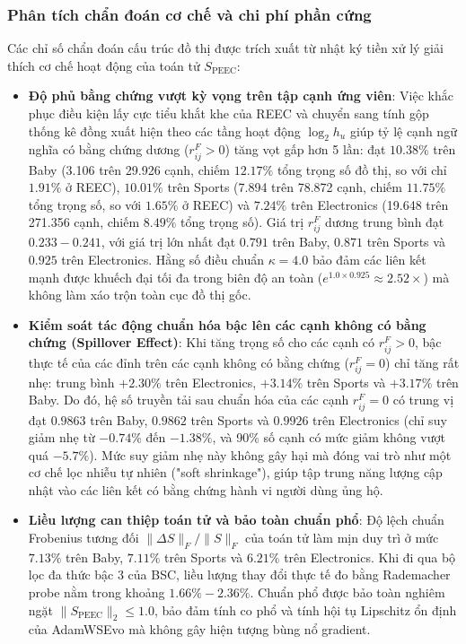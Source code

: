 \subsubsection{Phân tích chẩn đoán cơ chế và chi phí phần cứng}

Các chỉ số chẩn đoán cấu trúc đồ thị được trích xuất từ nhật ký tiền xử lý giải thích cơ chế hoạt động của toán tử $S_{\text{PEEC}}$:
\begin{itemize}
    \item \textbf{Độ phủ bằng chứng vượt kỳ vọng trên tập cạnh ứng viên}: Việc khắc phục điều kiện lấy cực tiểu khắt khe của REEC và chuyển sang tính gộp thống kê đồng xuất hiện theo các tầng hoạt động $\log_2 h_u$ giúp tỷ lệ cạnh ngữ nghĩa có bằng chứng dương ($r_{ij}^F > 0$) tăng vọt gấp hơn 5 lần: đạt $10.38\%$ trên Baby (3.106 trên 29.926 cạnh, chiếm $12.17\%$ tổng trọng số đồ thị, so với chỉ $1.91\%$ ở REEC), $10.01\%$ trên Sports (7.894 trên 78.872 cạnh, chiếm $11.75\%$ tổng trọng số, so với $1.65\%$ ở REEC) và $7.24\%$ trên Electronics (19.648 trên 271.356 cạnh, chiếm $8.49\%$ tổng trọng số). Giá trị $r_{ij}^F$ dương trung bình đạt $0.233 - 0.241$, với giá trị lớn nhất đạt $0.791$ trên Baby, $0.871$ trên Sports và $0.925$ trên Electronics. Hằng số điều chuẩn $\kappa = 4.0$ bảo đảm các liên kết mạnh được khuếch đại tối đa trong biên độ an toàn ($e^{1.0 \times 0.925} \approx 2.52\times$) mà không làm xáo trộn toàn cục đồ thị gốc.
    \item \textbf{Kiểm soát tác động chuẩn hóa bậc lên các cạnh không có bằng chứng (Spillover Effect)}: Khi tăng trọng số cho các cạnh có $r_{ij}^F > 0$, bậc thực tế của các đỉnh trên các cạnh không có bằng chứng ($r_{ij}^F = 0$) chỉ tăng rất nhẹ: trung bình $+2.30\%$ trên Electronics, $+3.14\%$ trên Sports và $+3.17\%$ trên Baby. Do đó, hệ số truyền tải sau chuẩn hóa của các cạnh $r_{ij}^F = 0$ có trung vị đạt $0.9863$ trên Baby, $0.9862$ trên Sports và $0.9926$ trên Electronics (chỉ suy giảm nhẹ từ $-0.74\%$ đến $-1.38\%$, và 90\% số cạnh có mức giảm không vượt quá $-5.7\%$). Mức suy giảm nhẹ này không gây hại mà đóng vai trò như một cơ chế lọc nhiễu tự nhiên ("soft shrinkage"), giúp tập trung năng lượng cập nhật vào các liên kết có bằng chứng hành vi người dùng ủng hộ.
    \item \textbf{Liều lượng can thiệp toán tử và bảo toàn chuẩn phổ}: Độ lệch chuẩn Frobenius tương đối $\|\Delta S\|_F / \|S\|_F$ của toán tử làm mịn duy trì ở mức $7.13\%$ trên Baby, $7.11\%$ trên Sports và $6.21\%$ trên Electronics. Khi đi qua bộ lọc đa thức bậc 3 của BSC, liều lượng thay đổi thực tế đo bằng Rademacher probe nằm trong khoảng $1.66\% - 2.36\%$. Chuẩn phổ được bảo toàn nghiêm ngặt $\|S_{\text{PEEC}}\|_2 \le 1.0$, bảo đảm tính co phổ và tính hội tụ Lipschitz ổn định của AdamWSEvo mà không gây hiện tượng bùng nổ gradient.
\end{itemize}

